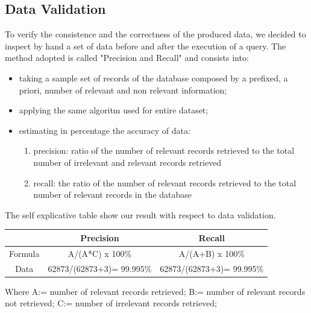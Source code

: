 \documentclass[conference, onecolumn]{IEEEtran}
\begin{document}
\subsection{Data Validation}
To verify the consistence and the correctness of the produced data, we decided to inspect by hand a set of data before and after the execution of a query. The method adopted is called "Precision and Recall" and consists into:
\begin{itemize}
	\item taking a sample set of records of the database composed by a prefixed, a priori, number of relevant and non relevant information;
	\item applying the same algoritm used for entire dataset;
	\item estimating in percentage the accuracy of data:
	\begin{enumerate}
	\item precision: ratio of the number of relevant records retrieved to the total number of irrelevant and relevant records retrieved
	\item recall: the ratio of the number of relevant records retrieved to the total number of relevant records in the database
\end{enumerate}
\end{itemize}

The self explicative table show our result with respect to data validation.
\medskip

\begin{tabular}{|c|c|c|}
	\hline & Precision & Recall \\ 
	\hline Formula & A/(A*C) x 100\% & A/(A+B) x 100\% \\ 
	\hline Data & 62873/(62873+3)= 99.995\% & 62873/(62873+3)= 99.995\% \\ 
	\hline 
\end{tabular}
\medskip

Where A:= number of relevant records retrieved; B:= number of relevant records not retrieved; C:= number of irrelevant records retrieved;
\end{document}
